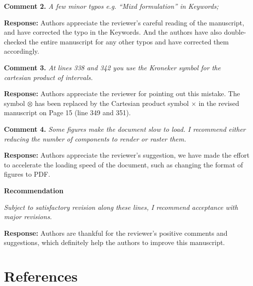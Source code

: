 \documentclass{article}
\begin{document}
\textbf{Comment 2.} \textit{
A few minor typos e.g. “Mixd formulation” in Keywords;
}

\textbf{Response:} Authors appreciate the reviewer's careful reading of the manuscript, and have corrected the typo in the Keywords.
And the authors have also double-checked the entire manuscript for any other typos and have corrected them accordingly.

\textbf{Comment 3.} \textit{
At lines 338 and 342 you use the Kroneker symbol for the cartesian product of intervals.
}

\textbf{Response:} Authors appreciate the reviewer for pointing out this mistake.
The symbol $\otimes$ has been replaced by the Cartesian product symbol $\times$ in the revised manuscript on Page 15 (line 349 and 351).

\textbf{Comment 4.} \textit{
Some figures make the document slow to load. I recommend either reducing the number of components to render or raster them.
}

\textbf{Response:} Authors appreciate the reviewer's suggestion, 
we have made the effort to accelerate the loading speed of the document, such as changing the format of figures to PDF. 

\textbf{Recommendation}

\textit{
Subject to satisfactory revision along these lines, I recommend acceptance with major revisions.
}

\textbf{Response:} 
Authors are thankful for the reviewer's positive comments and suggestions, which definitely help the authors to improve this manuscript.


\section*{References}
\end{document}
